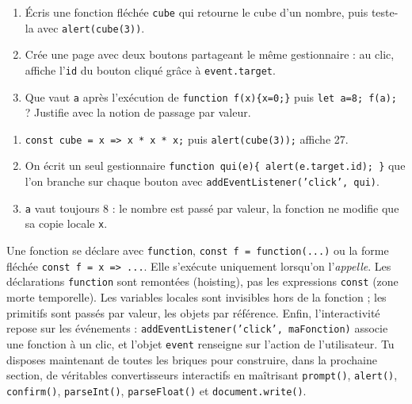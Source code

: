 \documentclass[11pt]{article}
\begin{document}
\begin{exercice}
\begin{enumerate}
\item Écris une fonction fléchée \texttt{cube} qui retourne le cube d'un nombre, puis teste-la avec \texttt{alert(cube(3))}.
\item Crée une page avec deux boutons partageant le même gestionnaire : au clic, affiche l'\texttt{id} du bouton cliqué grâce à \texttt{event.target}.
\item Que vaut \texttt{a} après l'exécution de \texttt{function f(x)\{x=0;\}} puis \texttt{let a=8; f(a);} ? Justifie avec la notion de passage par valeur.
\end{enumerate}
\end{exercice}

\begin{corrige}[Exercice]
\begin{enumerate}
\item \texttt{const cube = x => x * x * x;} puis \texttt{alert(cube(3));} affiche 27.
\item On écrit un seul gestionnaire \texttt{function qui(e)\{ alert(e.target.id); \}} que l'on branche sur chaque bouton avec \texttt{addEventListener('click', qui)}.
\item \texttt{a} vaut toujours 8 : le nombre est passé par valeur, la fonction ne modifie que sa copie locale \texttt{x}.
\end{enumerate}
\end{corrige}

\begin{aretenir}
Une fonction se déclare avec \texttt{function}, \texttt{const f = function(...)} ou la forme fléchée \texttt{const f = x => ...}. Elle s'exécute uniquement lorsqu'on l'\emph{appelle}. Les déclarations \texttt{function} sont remontées (hoisting), pas les expressions \texttt{const} (zone morte temporelle). Les variables locales sont invisibles hors de la fonction ; les primitifs sont passés par valeur, les objets par référence. Enfin, l'interactivité repose sur les événements : \texttt{addEventListener('click', maFonction)} associe une fonction à un clic, et l'objet \texttt{event} renseigne sur l'action de l'utilisateur. Tu disposes maintenant de toutes les briques pour construire, dans la prochaine section, de véritables convertisseurs interactifs en maîtrisant \texttt{prompt()}, \texttt{alert()}, \texttt{confirm()}, \texttt{parseInt()}, \texttt{parseFloat()} et \texttt{document.write()}.
\end{aretenir}
\end{document}
